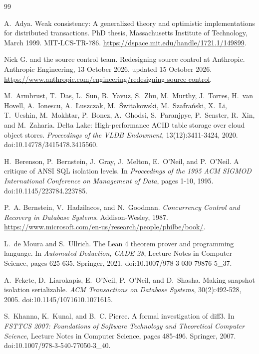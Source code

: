 \documentclass[11pt,letterpaper]{article}
\theoremstyle{definition}
\theoremstyle{remark}
\begin{document}
\begin{thebibliography}{99}
\small

A.~Adya.
Weak consistency: A generalized theory and optimistic implementations for distributed transactions.
PhD thesis, Massachusetts Institute of Technology, March 1999. MIT-LCS-TR-786.
\url{https://dspace.mit.edu/handle/1721.1/149899}.

Nick G. and the source control team.
Redesigning source control at Anthropic.
Anthropic Engineering, 13 October 2026, updated 15 October 2026.
\url{https://www.anthropic.com/engineering/redesigning-source-control}.

M.~Armbrust, T.~Das, L.~Sun, B.~Yavuz, S.~Zhu, M.~Murthy, J.~Torres, H.~van Hovell, A.~Ionescu, A.~{\L}uszczak, M.~{\'S}witakowski, M.~Szafra{\'n}ski, X.~Li, T.~Ueshin, M.~Mokhtar, P.~Boncz, A.~Ghodsi, S.~Paranjpye, P.~Senster, R.~Xin, and M.~Zaharia.
Delta Lake: High-performance ACID table storage over cloud object stores.
\emph{Proceedings of the VLDB Endowment}, 13(12):3411-3424, 2020.
doi:10.14778/3415478.3415560.

H.~Berenson, P.~Bernstein, J.~Gray, J.~Melton, E.~O'Neil, and P.~O'Neil.
A critique of ANSI SQL isolation levels.
In \emph{Proceedings of the 1995 ACM SIGMOD International Conference on Management of Data}, pages 1-10, 1995.
doi:10.1145/223784.223785.

P.~A. Bernstein, V.~Hadzilacos, and N.~Goodman.
\emph{Concurrency Control and Recovery in Database Systems}.
Addison-Wesley, 1987.
\url{https://www.microsoft.com/en-us/research/people/philbe/book/}.

L.~de Moura and S.~Ullrich.
The Lean 4 theorem prover and programming language.
In \emph{Automated Deduction, CADE 28}, Lecture Notes in Computer Science, pages 625-635. Springer, 2021.
doi:10.1007/978-3-030-79876-5\_37.

A.~Fekete, D.~Liarokapis, E.~O'Neil, P.~O'Neil, and D.~Shasha.
Making snapshot isolation serializable.
\emph{ACM Transactions on Database Systems}, 30(2):492-528, 2005.
doi:10.1145/1071610.1071615.

S.~Khanna, K.~Kunal, and B.~C. Pierce.
A formal investigation of diff3.
In \emph{FSTTCS 2007: Foundations of Software Technology and Theoretical Computer Science}, Lecture Notes in Computer Science, pages 485-496. Springer, 2007.
doi:10.1007/978-3-540-77050-3\_40.


\end{thebibliography}
\end{document}
